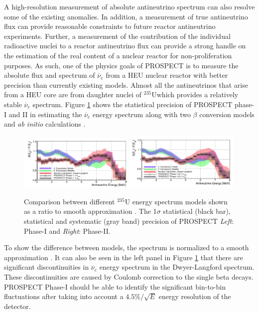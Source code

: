 \documentclass[11pt]{article}
\newcommand{\nuebar}{\ensuremath{\overline{\nu }_{e}} \hspace{1pt}}
\newcommand{\Ur}{\ensuremath{^{235} \textrm{U} }\hspace{1pt}}
\numberwithin{equation}{section}
\begin{document}
A high-resolution measurement of absolute antineutrino spectrum can also resolve some of the existing anomalies. In addition, a measurement of true antineutrino flux can provide reasonable constraints to future reactor antineutrino experiments. Further, a measurement of the contribution of the individual radioactive nuclei to a reactor antineutrino flux can provide a strong handle on the estimation of the real content of a nuclear reactor for non-proliferation purposes.  As such, one of the physics goals of PROSPECT is to measure the absolute flux and spectrum  of \nuebar  from a HEU nuclear reactor with better precision than currently existing models. Almost all the antineutrinos that arise from a HEU core are from daughter nuclei of \Ur which provides a relatively stable \nuebar  spectrum. Figure \ref{fig:neutrinoModels} shows the statistical precision of PROSPECT phase-I and II in estimating the \nuebar energy spectrum along with two $\beta$ conversion models and \textit{ab initio} calculations \cite{DLSpectrum}.
 \begin{figure}[h]
\centering
\includegraphics*[trim=0.1cm 0.1cm 0.1cm 0.1cm, clip=true, width=0.49\textwidth]{./antiNuSpectraComparison_VsSmoothModel_PROSPECT_v3.PNG}
\includegraphics*[trim=0.1cm 0.1cm 0.1cm 0.1cm, clip=true, width=0.49\textwidth]{./antiNuSpectraComparison_VsSmoothModel_PROSPECT_eres4p5pct_v3.PNG}
\caption[Comparison between  $^{235}$\textrm{U} energy spectrum models]{Comparison between different  $^{235}$\textrm{U} energy spectrum models shown as a ratio to smooth approximation \cite{vogel1989neutrino}. The 1$\sigma$ statistical (black bar), statistical and systematic (gray band) precision of PROSPECT \textit{Left}: Phase-I and \textit{Right}: Phase-II.}
\label{fig:neutrinoModels}
\end{figure}
To show the difference between models, the spectrum is normalized to a smooth approximation \cite{vogel1989neutrino}. It can also be seen in the left panel in Figure \ref{fig:neutrinoModels} that there are significant discontinuities in \nuebar energy spectrum in the Dwyer-Langford spectrum. These discontinuities are caused by Coulomb correction to the single beta decays. PROSPECT Phase-I should be able to identify the significant bin-to-bin fluctuations after taking into account a $4.5 \%/\sqrt{E}$ energy resolution of the detector. 
\end{document}
